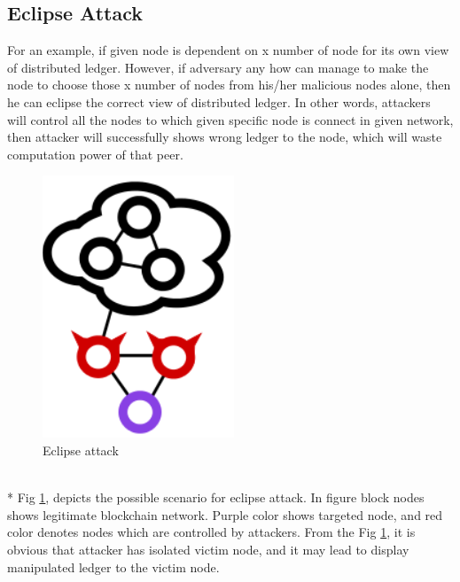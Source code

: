 \documentclass[a4paper,twoside,12pt]{report}
\begin{document}
\begin{spacing}{1.5}
\subsection{Eclipse Attack}
For an example, if given node is dependent on x number of node for its own view of distributed ledger. However, if adversary any how can manage to make the node to choose those x number of nodes from his/her malicious nodes alone, then he can eclipse the correct view of distributed ledger. In other words, attackers will control all the nodes to which given specific node is connect in given network, then attacker will successfully shows wrong ledger to the node, which will waste computation power of that peer.   	 
\begin{figure}[h!]
\begin{center}
  \includegraphics[width=0.3\linewidth]{images/eclipseattack.png}
  \caption{\fontsize{10}{10}\selectfont Eclipse attack}
  \label{img: eclipse}
\end{center}
\end{figure}
\\*
Fig \ref{img: eclipse}, depicts the possible scenario for eclipse attack. In figure block nodes shows legitimate blockchain network. Purple color shows targeted node, and red color denotes nodes which are controlled by attackers. From the Fig \ref{img: eclipse}, it is obvious that attacker has isolated victim node, and it may lead to display manipulated ledger to the victim node.  

\end{spacing}
\end{document}
